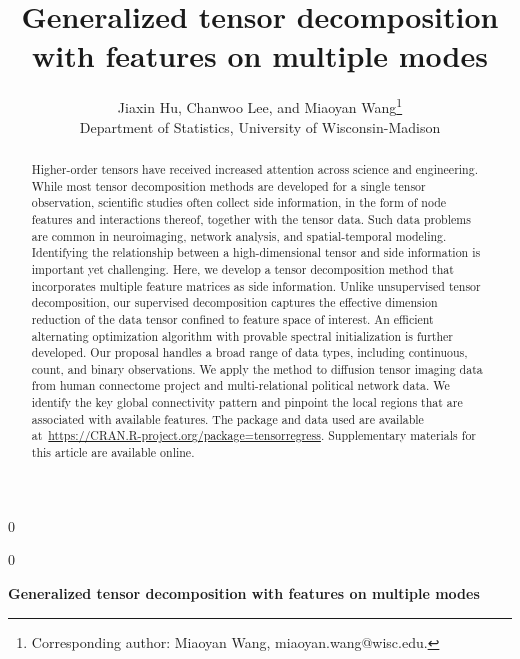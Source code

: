 \documentclass[12pt]{article}
\newcommand{\blind}{0}
\theoremstyle{definition}
\theoremstyle{definition}
\begin{document}
%

\def\spacingset#1{\renewcommand{\baselinestretch}%
{#1}\small\normalsize} \spacingset{1}




\blind
{
  \title{\bf Generalized tensor decomposition with features on multiple modes}
  \author{Jiaxin Hu, Chanwoo Lee, and Miaoyan Wang\thanks{Corresponding author: Miaoyan Wang, miaoyan.wang@wisc.edu. }\hspace{.2cm}\\
    Department of Statistics, University of Wisconsin-Madison}
    
    \date{}
  \maketitle
  
} \fi

\blind
{
  \bigskip
  \bigskip
  \bigskip
  \begin{center}
    {\LARGE\bf Generalized tensor decomposition with features on multiple modes}
\end{center}
  \medskip
} \fi


\bigskip
\begin{abstract}
Higher-order tensors have received increased attention across science and engineering. While most tensor decomposition methods are developed for a single tensor observation, scientific studies often collect side information, in the form of node features and interactions thereof, together with the tensor data. Such data problems are common in neuroimaging, network analysis, and spatial-temporal modeling. Identifying the relationship between a high-dimensional tensor and side information is important yet challenging. Here, we develop a tensor decomposition method that incorporates multiple feature matrices as side information. Unlike unsupervised tensor decomposition, our supervised decomposition captures the effective dimension reduction of the data tensor confined to feature space of interest. An efficient alternating optimization algorithm with provable spectral initialization is further developed. Our proposal handles a broad range of data types, including continuous, count, and binary observations. We apply the method to diffusion tensor imaging data from human connectome project and multi-relational political network data. We identify the key global connectivity pattern and pinpoint the local regions that are associated with available features. The package and data used are available at~\url{https://CRAN.R-project.org/package=tensorregress}. Supplementary materials for this article are available online.

\end{abstract}
\end{document}
